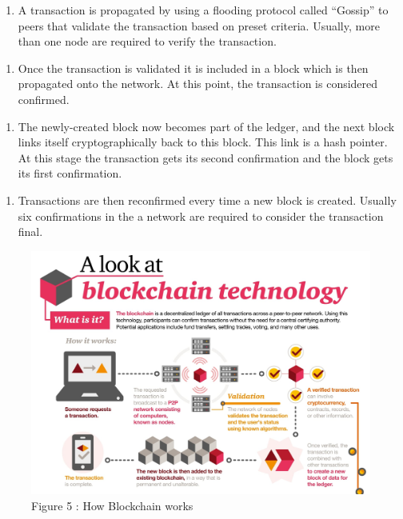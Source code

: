 \documentclass[11pt]{article}
\makeatletter
\def\maxwidth{\ifdim\Gin@nat@width>\linewidth\linewidth
    \else\Gin@nat@width\fi}
\let\Oldincludegraphics\includegraphics
\renewcommand{\includegraphics}[1]{\Oldincludegraphics[width=.8\maxwidth]{#1}}
\providecommand{\tightlist}{%
      \setlength{\itemsep}{0pt}\setlength{\parskip}{0pt}}
\makeatother
\begin{document}
    \begin{enumerate}
\def\labelenumi{\arabic{enumi}.}
\setcounter{enumi}{1}
\tightlist
\item
  A transaction is propagated by using a flooding protocol called
  ``Gossip'' to peers that validate the transaction based on preset
  criteria. Usually, more than one node are required to verify the
  transaction.
\end{enumerate}

    \begin{enumerate}
\def\labelenumi{\arabic{enumi}.}
\setcounter{enumi}{2}
\tightlist
\item
  Once the transaction is validated it is included in a block which is
  then propagated onto the network. At this point, the transaction is
  considered confirmed.
\end{enumerate}

    \begin{enumerate}
\def\labelenumi{\arabic{enumi}.}
\setcounter{enumi}{3}
\tightlist
\item
  The newly-created block now becomes part of the ledger, and the next
  block links itself cryptographically back to this block. This link is
  a hash pointer. At this stage the transaction gets its second
  confirmation and the block gets its first confirmation.
\end{enumerate}

    \begin{enumerate}
\def\labelenumi{\arabic{enumi}.}
\setcounter{enumi}{4}
\tightlist
\item
  Transactions are then reconfirmed every time a new block is created.
  Usually six confirmations in the a network are required to consider
  the transaction final.
\end{enumerate}


\begin{figure}[H]
	\centering
		\includegraphics{blockchain.jpg}
		  \caption{Figure 5 : How Blockchain works}
\end{figure}
\end{document}
